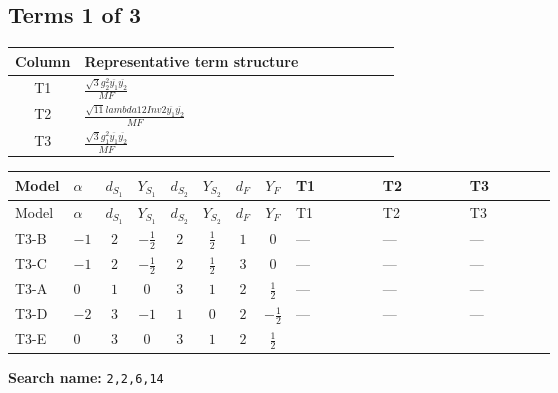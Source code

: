 \documentclass[8pt]{article}
\begin{document}
\begin{landscape}
\subsection*{Terms 1 of 3}
\begin{center}
\begin{tabular}{@{}c >{\raggedright\arraybackslash}p{0.82\linewidth}@{}}
\toprule
Column & Representative term structure \\
\midrule
T1 & \(\displaystyle \frac{\sqrt{3} g_{2}^{2} \overline{y_{1}} \overline{y_{2}}}{MF}\) \\
\midrule
T2 & \(\displaystyle \frac{\sqrt{11} lambda12Inv2 \overline{y_{1}} \overline{y_{2}}}{MF}\) \\
\midrule
T3 & \(\displaystyle \frac{\sqrt{3} g_{1}^{2} \overline{y_{1}} \overline{y_{2}}}{MF}\) \\
\midrule
\bottomrule
\end{tabular}
\end{center}
\smallskip
\tiny
\begin{longtable}{@{}llcccccc >{\raggedright\arraybackslash}p{0.21\linewidth} >{\raggedright\arraybackslash}p{0.21\linewidth} >{\raggedright\arraybackslash}p{0.21\linewidth}@{}}
\toprule
Model & $\alpha$ & $d_{S_1}$ & $Y_{S_1}$ & $d_{S_2}$ & $Y_{S_2}$ & $d_F$ & $Y_F$ & T1 & T2 & T3 \\
\midrule
\endfirsthead
\toprule
Model & $\alpha$ & $d_{S_1}$ & $Y_{S_1}$ & $d_{S_2}$ & $Y_{S_2}$ & $d_F$ & $Y_F$ & T1 & T2 & T3 \\
\midrule
\endhead
T3-B & $-1$ & $2$ & $-\frac{1}{2}$ & $2$ & $\frac{1}{2}$ & $1$ & $0$ & --- & --- & --- \\
\midrule
T3-C & $-1$ & $2$ & $-\frac{1}{2}$ & $2$ & $\frac{1}{2}$ & $3$ & $0$ & --- & --- & --- \\
\midrule
T3-A & $0$ & $1$ & $0$ & $3$ & $1$ & $2$ & $\frac{1}{2}$ & --- & --- & --- \\
\midrule
T3-D & $-2$ & $3$ & $-1$ & $1$ & $0$ & $2$ & $-\frac{1}{2}$ & --- & --- & --- \\
\midrule
T3-E & $0$ & $3$ & $0$ & $3$ & $1$ & $2$ & $\frac{1}{2}$ & \scriptsize\adjustbox{max width=\linewidth}{$\begin{gathered} - \frac{49 \sqrt{3} g_{2}^{2} \overline{y_{1}} \overline{y_{2}}}{24 MF}\end{gathered}$} & \scriptsize\adjustbox{max width=\linewidth}{$\begin{gathered} - \frac{3 \sqrt{11} lambda12Inv2 \overline{y_{1}} \overline{y_{2}}}{22 MF}\end{gathered}$} & \scriptsize\adjustbox{max width=\linewidth}{$\begin{gathered} - \frac{\sqrt{3} g_{1}^{2} \overline{y_{1}} \overline{y_{2}}}{8 MF}\end{gathered}$} \\
\midrule
\bottomrule
\end{longtable}
\clearpage
\noindent\textbf{Search name: }\texttt{2,2,6,14}\par\smallskip

\end{landscape}
\end{document}
